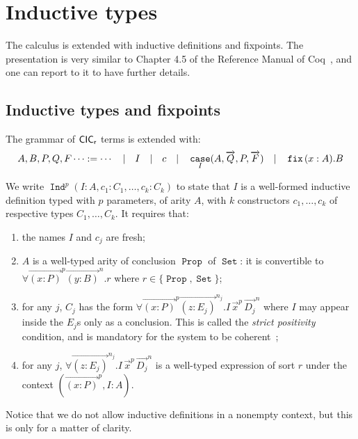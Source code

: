 \documentclass[a4paper,USenglish]{lipics}
\newtheorem{lem}{Lemma}
\DeclareMathOperator{\Prop}{\mathtt{Prop}}
\DeclareMathOperator{\Set}{\mathtt{Set}}
\DeclareMathOperator{\Ind}{\mathtt{Ind}}
\DeclareMathOperator{\case}{\mathtt{case}}
\DeclareMathOperator{\fix}{\mathtt{fix}}
\def\coq{\textsf{Coq}\xspace}
\def\cicr{$\text{\textsf{CIC}}_{\text{\textsf{r}}}$\xspace}
\newcommand{\arrlong}[1]{\overrightarrow{#1}}
\newcommand{\arrvar}[1]{\vec{#1}}
\newcommand\arr[1]{
  \StrLen{$#1$}[\MyStrLen]
  \ifthenelse{\equal{\MyStrLen}{1}}
       {\arrvar{#1}\,\,\!}{\arrlong{#1}}}
\newcommand\arn[2]{
{\arrlong{#1}}^{#2}
}
\begin{document}
\begin{comment}
The refined calculus of constructions \cicr admits the following properties:
\begin{lem}[Miscellaneous properties]~\\ \vspace{-1em}
\begin{enumerate}
\item If $Γ,x:A ⊢ M : B$ then $x \not\in Γ$ and $Γ ⊢ A : s$.
\item (Substitution lemma) If $Γ,x:A,Γ' ⊢ M : B$ and $Γ ⊢ N : A$ then
  $Γ,Γ'[N/x] ⊢ M[N/x] : B[N/x]$.
\item (Subject reduction) If $Γ ⊢ M : A$ and $M \rhd_{\beta} N$ then $Γ
  ⊢ N : A$.
\end{enumerate}
\end{lem}
\end{comment}

\section{Inductive types}\label{sec:inductive}

The calculus is extended with inductive definitions and fixpoints. The presentation is
very similar to Chapter 4.5 of the Reference Manual of
\coq~\cite{Coqdev11}, and one can report to it to have further details.


\subsection{Inductive types and fixpoints}

The grammar of \cicr terms is extended with:
\[
  A, B, P, Q, F  \dots := \cdots \quad  | \quad  I \quad | \quad c \quad
  | \quad \case_I(A,\arr{Q}, P, \arr{F}) \quad | \quad \fix\,(x : A).B
\]

We write $\Ind^p(I:A, c_1:C_1,\dots,c_k:C_k)$ to state that $I$ is a
well-formed inductive definition typed with $p$ parameters,
of arity $A$, with $k$ constructors $c_1,\dots, c_k$ of respective types $C_1,\dots,C_k$.
It requires that:
\begin{enumerate}
\item the names $I$ and $c_j$ are fresh;
\item $A$ is a well-typed arity of conclusion $\Prop$ of $\Set$: it is
  convertible to $∀\arn{(x:P)}{p}\arn{(y:B)}{n}.r$ where $r \in \{\Prop,\Set\}$;
 \item for any $j$, $C_j$ has the form
   $∀\arn{(x:P)}{p}\arn{(z:E_j)}{n_j}.I\,\arn{x}{p}\,\arn{D_j}{n}$ where
   $I$ may appear inside the $E_j$s only as a conclusion. This is called
   the \emph{strict positivity} condition, and is mandatory for the
   system to be coherent~\cite{DBLP:conf/colog/CoquandP88};
 \item for any $j$, $∀\arn{(z:E_j)}{n_j}.I\,\arn{x}{p}\,\arn{D_j}{n}$ is a well-typed expression of sort $r$ under
   the context $(\arn{(x:P)}{p}, I : A)$.
\end{enumerate}
Notice that we do not allow inductive definitions in a nonempty context,
but this is only for a matter of clarity.
\end{document}

